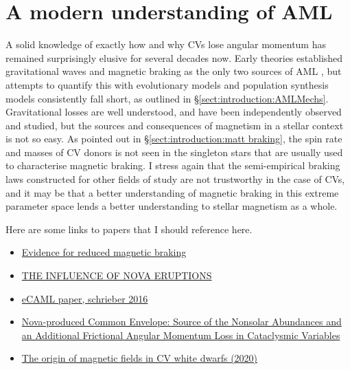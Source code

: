 \section{A modern understanding of AML}
A solid knowledge of exactly how and why CVs lose angular momentum has remained surprisingly elusive for several decades now. Early theories established gravitational waves and magnetic braking as the only two sources of AML , but attempts to quantify this with evolutionary models  and population synthesis models  consistently fall short, as outlined in \S\ref{sect:introduction:AMLMechs}. Gravitational losses are well understood, and have been independently observed and studied, but the sources and consequences of magnetism in a stellar context is not so easy. 
As pointed out in \S\ref{sect:introduction:matt braking}, the spin rate and masses of CV donors is not seen in the singleton stars that are usually used to characterise magnetic braking. I stress again that the semi-empirical braking laws constructed for other fields of study are not trustworthy in the case of CVs, and it may be that a better understanding of magnetic braking in this extreme parameter space lends a better understanding to stellar magnetism as a whole. 


Here are some links to papers that I should reference here.
\begin{itemize}
    \item \href{https://ui.adsabs.harvard.edu/abs/2020MNRAS.491.5717B/abstract}{Evidence for reduced magnetic braking}
    \item \href{https://iopscience.iop.org/article/10.3847/0004-637X/817/1/69}{THE INFLUENCE OF NOVA ERUPTIONS}
    \item \href{https://academic.oup.com/mnrasl/article/455/1/L16/2589619}{eCAML paper, schrieber 2016}
    \item \href{https://ui.adsabs.harvard.edu/abs/2021ApJ...914....5S/abstract}{Nova-produced Common Envelope: Source of the Nonsolar Abundances and an Additional Frictional Angular Momentum Loss in Cataclysmic Variables}
    \item \href{https://ui.adsabs.harvard.edu/abs/2018MNRAS.481.3604B/abstract}{The origin of magnetic fields in CV white dwarfs (2020)}
\end{itemize}

